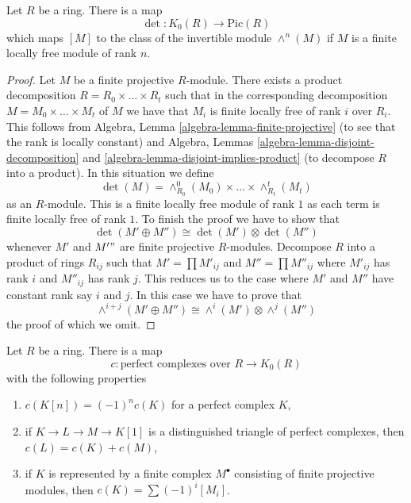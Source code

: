 \begin{lemma}
\label{lemma-det}
Let $R$ be a ring. There is a map
$$
\det : K_0(R) \longrightarrow \text{Pic}(R)
$$
which maps $[M]$ to the class of the invertible module
$\wedge^n(M)$ if $M$ is a finite locally free module of rank $n$.
\end{lemma}

\begin{proof}
Let $M$ be a finite projective $R$-module. There exists a product
decomposition $R = R_0 \times \ldots \times R_t$ such that
in the corresponding decomposition $M = M_0 \times \ldots \times M_t$
of $M$ we have that $M_i$ is finite locally free of rank $i$ over $R_i$.
This follows from Algebra, Lemma \ref{algebra-lemma-finite-projective}
(to see that the rank is locally constant) and
Algebra, Lemmas \ref{algebra-lemma-disjoint-decomposition} and
\ref{algebra-lemma-disjoint-implies-product} (to decompose
$R$ into a product). In this situation we define
$$
\det(M) = \wedge^0_{R_0}(M_0) \times \ldots \times \wedge^t_{R_t}(M_t)
$$
as an $R$-module. This is a finite locally free module of rank $1$
as each term is finite locally free of rank $1$. To finish the proof
we have to show that
$$
\det(M' \oplus M'') \cong \det(M') \otimes \det(M'')
$$
whenever $M'$ and $M'"$ are finite projective $R$-modules.
Decompose $R$ into a product of rings $R_{ij}$ such that
$M' = \prod M'_{ij}$ and $M'' = \prod M''_{ij}$ where
$M'_{ij}$ has rank $i$ and $M''_{ij}$ has rank $j$. This reduces
us to the case where $M'$ and $M''$ have constant rank say $i$ and $j$.
In this case we have to prove that
$$
\wedge^{i + j}(M' \oplus M'') \cong \wedge^i(M') \otimes \wedge^j(M'')
$$
the proof of which we omit.
\end{proof}

\begin{lemma}
\label{lemma-perfect-to-K-group}
Let $R$ be a ring. There is a map
$$
c : \text{perfect complexes over }R \longrightarrow K_0(R)
$$
with the following properties
\begin{enumerate}
\item $c(K[n]) = (-1)^nc(K)$ for a perfect complex $K$,
\item if $K \to L \to M \to K[1]$ is a distinguished triangle of
perfect complexes, then $c(L) = c(K) + c(M)$,
\item if $K$ is represented by a finite complex $M^\bullet$
consisting of finite projective modules, then
$c(K) = \sum (-1)^i[M_i]$.
\end{enumerate}
\end{lemma}

